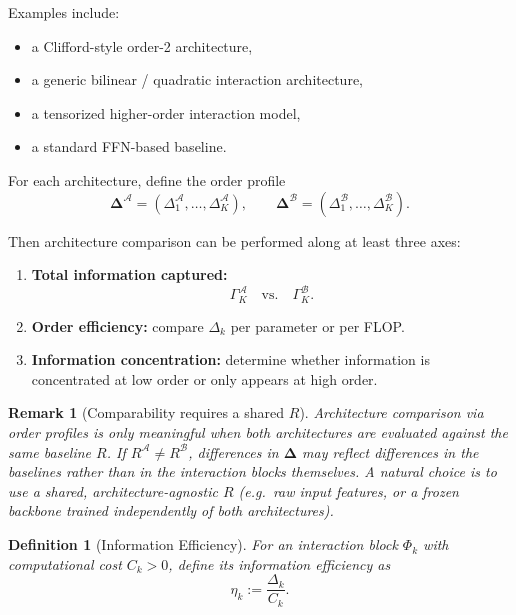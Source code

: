 \documentclass[11pt]{article}
\newtheorem{definition}{Definition}
\newtheorem{remark}{Remark}
\newcommand{\1}{\mathbf{1}}
\begin{document}
Examples include:
\begin{itemize}[leftmargin=1.5em]
    \item a Clifford-style order-2 architecture,
    \item a generic bilinear / quadratic interaction architecture,
    \item a tensorized higher-order interaction model,
    \item a standard FFN-based baseline.
\end{itemize}

For each architecture, define the order profile
\[
\bm{\Delta}^{\mathcal{A}} = (\Delta_1^{\mathcal{A}},\ldots,\Delta_K^{\mathcal{A}}),
\qquad
\bm{\Delta}^{\mathcal{B}} = (\Delta_1^{\mathcal{B}},\ldots,\Delta_K^{\mathcal{B}}).
\]

Then architecture comparison can be performed along at least three axes:
\begin{enumerate}[leftmargin=1.5em]
    \item \textbf{Total information captured:}
    \[
    \Gamma_K^{\mathcal{A}}
    \quad \text{vs.} \quad
    \Gamma_K^{\mathcal{B}}.
    \]
    \item \textbf{Order efficiency:} compare $\Delta_k$ per parameter or per FLOP.
    \item \textbf{Information concentration:} determine whether information is concentrated at low
    order or only appears at high order.
\end{enumerate}

\begin{remark}[Comparability requires a shared $R$]
Architecture comparison via order profiles is only meaningful when both architectures are
evaluated against the \emph{same} baseline $R$.
If $R^{\mathcal{A}} \neq R^{\mathcal{B}}$, differences in $\bm{\Delta}$ may reflect differences in
the baselines rather than in the interaction blocks themselves.
A natural choice is to use a shared, architecture-agnostic $R$ (e.g.\ raw input features, or a
frozen backbone trained independently of both architectures).
\end{remark}

\begin{definition}[Information Efficiency]
For an interaction block $\Phi_k$ with computational cost $C_k > 0$, define its information
efficiency as
\begin{equation}
\eta_k := \frac{\Delta_k}{C_k}.
\label{eq:information_efficiency}
\end{equation}
\end{definition}
\end{document}
